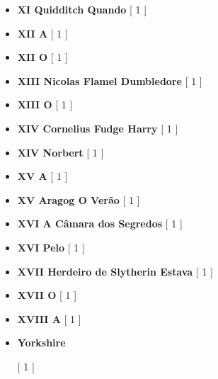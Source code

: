 \documentclass[a4paper]{article}
\begin{document}
\begin{itemize}
	\item \textbf{XI Quidditch Quando} [ 1 ]
	\item \textbf{XII A} [ 1 ]
	\item \textbf{XII O} [ 1 ]
	\item \textbf{XIII Nicolas Flamel Dumbledore} [ 1 ]
	\item \textbf{XIII O} [ 1 ]
	\item \textbf{XIV Cornelius Fudge Harry} [ 1 ]
	\item \textbf{XIV Norbert} [ 1 ]
	\item \textbf{XV A} [ 1 ]
	\item \textbf{XV Aragog O Verão} [ 1 ]
	\item \textbf{XVI A Câmara dos Segredos} [ 1 ]
	\item \textbf{XVI Pelo} [ 1 ]
	\item \textbf{XVII Herdeiro de Slytherin Estava} [ 1 ]
	\item \textbf{XVII O} [ 1 ]
	\item \textbf{XVIII A} [ 1 ]
	\item \hypertarget{Y}{\textbf{Yorkshire}} [ 1 ]
\end{itemize}
\end{document}
